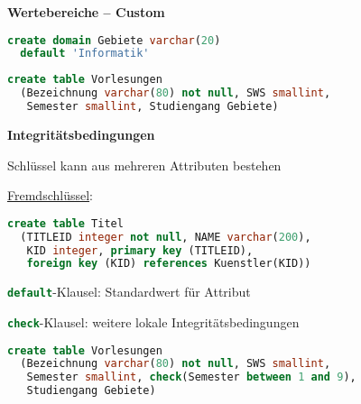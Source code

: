 \textbf{Wertebereiche -- Custom}
\begin{items}
	\item \begin{lstlisting}[language=sql]
create domain Gebiete varchar(20)
  default 'Informatik'
\end{lstlisting}
	\item \begin{lstlisting}[language=sql]
create table Vorlesungen
  (Bezeichnung varchar(80) not null, SWS smallint,
   Semester smallint, Studiengang Gebiete)
\end{lstlisting}
\end{items}

\textbf{Integritätsbedingungen}
\begin{items}
	\item Schlüssel kann aus mehreren Attributen bestehen
	\item \underline{Fremdschlüssel}: \begin{lstlisting}[language=sql]
create table Titel
  (TITLEID integer not null, NAME varchar(200), 
   KID integer, primary key (TITLEID), 
   foreign key (KID) references Kuenstler(KID))
\end{lstlisting}
	\item \lstinline[language=sql]{default}-Klausel: Standardwert für Attribut
	\item \lstinline[language=sql]{check}-Klausel: weitere lokale Integritätsbedingungen
	\item \begin{lstlisting}[language=sql]
create table Vorlesungen
  (Bezeichnung varchar(80) not null, SWS smallint,
   Semester smallint, check(Semester between 1 and 9), 
   Studiengang Gebiete)
\end{lstlisting}
\end{items}

\newpage

